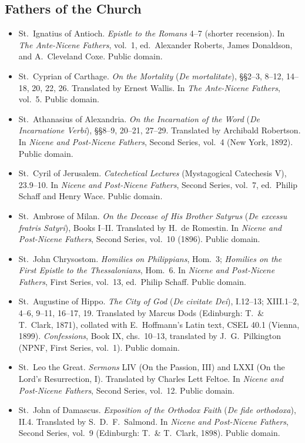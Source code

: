 \subsection*{Fathers of the Church}

\begin{itemize}
\item St.\ Ignatius of Antioch. \textit{Epistle to the Romans} 4--7 (shorter recension). In \textit{The Ante-Nicene Fathers}, vol.\ 1, ed.\ Alexander Roberts, James Donaldson, and A.\ Cleveland Coxe. Public domain.
\item St.\ Cyprian of Carthage. \textit{On the Mortality} (\textit{De mortalitate}), \S\S 2--3, 8--12, 14--18, 20, 22, 26. Translated by Ernest Wallis. In \textit{The Ante-Nicene Fathers}, vol.\ 5. Public domain.
\item St.\ Athanasius of Alexandria. \textit{On the Incarnation of the Word} (\textit{De Incarnatione Verbi}), \S\S 8--9, 20--21, 27--29. Translated by Archibald Robertson. In \textit{Nicene and Post-Nicene Fathers}, Second Series, vol.\ 4 (New York, 1892). Public domain.
\item St.\ Cyril of Jerusalem. \textit{Catechetical Lectures} (Mystagogical Catechesis V), 23.9--10. In \textit{Nicene and Post-Nicene Fathers}, Second Series, vol.\ 7, ed.\ Philip Schaff and Henry Wace. Public domain.
\item St.\ Ambrose of Milan. \textit{On the Decease of His Brother Satyrus} (\textit{De excessu fratris Satyri}), Books I--II. Translated by H.\ de Romestin. In \textit{Nicene and Post-Nicene Fathers}, Second Series, vol.\ 10 (1896). Public domain.
\item St.\ John Chrysostom. \textit{Homilies on Philippians}, Hom.\ 3; \textit{Homilies on the First Epistle to the Thessalonians}, Hom.\ 6. In \textit{Nicene and Post-Nicene Fathers}, First Series, vol.\ 13, ed.\ Philip Schaff. Public domain.
\item St.\ Augustine of Hippo. \textit{The City of God} (\textit{De civitate Dei}), I.12--13; XIII.1--2, 4--6, 9--11, 16--17, 19. Translated by Marcus Dods (Edinburgh: T.\ \& T.\ Clark, 1871), collated with E.\ Hoffmann's Latin text, CSEL 40.1 (Vienna, 1899). \textit{Confessions}, Book IX, chs.\ 10--13, translated by J.\ G.\ Pilkington (NPNF, First Series, vol.\ 1). Public domain.
\item St.\ Leo the Great. \textit{Sermons} LIV (On the Passion, III) and LXXI (On the Lord's Resurrection, I). Translated by Charles Lett Feltoe. In \textit{Nicene and Post-Nicene Fathers}, Second Series, vol.\ 12. Public domain.
\item St.\ John of Damascus. \textit{Exposition of the Orthodox Faith} (\textit{De fide orthodoxa}), II.4. Translated by S.\ D.\ F.\ Salmond. In \textit{Nicene and Post-Nicene Fathers}, Second Series, vol.\ 9 (Edinburgh: T.\ \& T.\ Clark, 1898). Public domain.
\end{itemize}

